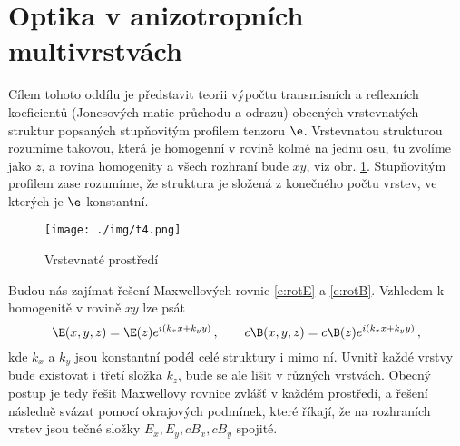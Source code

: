 \section{Optika v anizotropních multivrstvách \cite{Berreman}}

Cílem tohoto oddílu je představit teorii výpočtu transmisních a reflexních koeficientů (Jonesových matic průchodu a odrazu) obecných vrstevnatých struktur popsaných stupňovitým profilem tenzoru $\e$.
Vrstevnatou strukturou rozumíme takovou, která je homogenní v rovině kolmé na jednu osu, tu zvolíme jako $z$, a rovina homogenity a všech rozhraní bude $xy$, viz obr. \ref{f:vrstevnate prostredi}.
Stupňovitým profilem zase rozumíme, že struktura je složená z konečného počtu vrstev, ve kterých je $\e$ konstantní.

\begin{figure}\centering
\texttt{[image: ./img/t4.png]}
\caption{Vrstevnaté prostředí}\label{f:vrstevnate prostredi}
\end{figure}

Budou nás zajímat řešení Maxwellových rovnic \eqref{e:rotE} a \eqref{e:rotB}.
Vzhledem k homogenitě v rovině $xy$ lze psát
\begin{equation} \label{e:kxy}
\E(x,y,z)=\E(z) e^{i(k_xx+k_yy)} \,, \qquad c\B(x,y,z)=c\B(z) e^{i(k_xx+k_yy)} \,,
\end{equation}
kde $k_x$ a $k_y$ jsou konstantní podél celé struktury i mimo ní.
Uvnitř každé vrstvy bude existovat i třetí složka $k_z$, bude se ale lišit v různých vrstvách.
Obecný postup je tedy řešit Maxwellovy rovnice zvlášť v každém prostředí, a řešení následně svázat pomocí okrajových podmínek, které říkají, že na rozhraních vrstev jsou tečné složky $E_x, E_y, cB_x, cB_y$ spojité.

